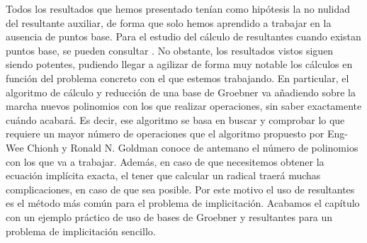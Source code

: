 Todos los resultados que hemos presentado tenían como hipótesis la no nulidad del resultante auxiliar, de forma que solo hemos aprendido a trabajar en la ausencia de puntos base. Para el estudio del cálculo de resultantes cuando existan puntos base, se pueden consultar \cite{base1, base2}. No obstante, los resultados vistos siguen siendo potentes, pudiendo llegar a agilizar de forma muy notable los cálculos en función del problema concreto con el que estemos trabajando. En particular, el algoritmo de cálculo y reducción de una base de Groebner va añadiendo sobre la marcha nuevos polinomios con los que realizar operaciones, sin saber exactamente cuándo acabará. Es decir, ese algoritmo se basa en buscar y comprobar lo que requiere un mayor número de operaciones que el algoritmo propuesto por Eng-Wee Chionh y Ronald N. Goldman \cite{res1} conoce de antemano el número de polinomios con los que va a trabajar. Además, en caso de que necesitemos obtener la ecuación implícita exacta, el tener que calcular un radical traerá muchas complicaciones, en caso de que sea posible. Por este motivo el uso de resultantes es el método más común para el problema de implicitación. Acabamos el capítulo con un ejemplo práctico de uso de bases de Groebner y resultantes para un problema de implicitación sencillo.
